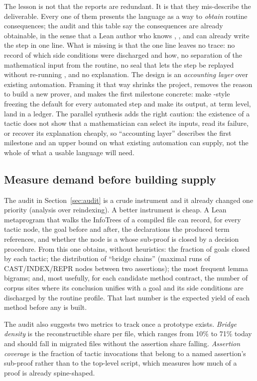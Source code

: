 \documentclass[11pt,a4paper]{article}
\newcommand{\code}[1]{\texttt{\detokenize{#1}}}
\theoremstyle{definition}
\begin{document}
The lesson is not that the reports are redundant. It is that they mis-describe the deliverable. Every one of them presents the language as a way to \emph{obtain} routine consequences; the audit and this table say the consequences are already obtainable, in the sense that a Lean author who knows \code{gcongr}, \code{positivity}, \code{push_cast} and \code{filter_upwards} can already write the step in one line. What is missing is that the one line leaves no trace: no record of which side conditions were discharged and how, no separation of the mathematical input from the routine, no seal that lets the step be replayed without re-running \code{simp}, and no explanation. The design is an \emph{accounting layer} over existing automation. Framing it that way shrinks the project, removes the reason to build a new prover, and makes the first milestone concrete: make \code{says}-style freezing the default for every automated step and make its output, at term level, land in a ledger. The parallel synthesis adds the right caution: the existence of a tactic does not show that a mathematician can select its inputs, read its failure, or recover its explanation cheaply, so ``accounting layer'' describes the first milestone and an upper bound on what existing automation can supply, not the whole of what a usable language will need.

\subsection{Measure demand before building supply}
\label{sec:demand}
The audit in Section~\ref{sec:audit} is a crude instrument and it already changed one priority (analysis over reindexing). A better instrument is cheap. A Lean metaprogram that walks the InfoTrees of a compiled file can record, for every tactic node, the goal before and after, the declarations the produced term references, and whether the node is a \code{have} whose sub-proof is closed by a decision procedure. From this one obtains, without heuristics: the fraction of goals closed by each tactic; the distribution of ``bridge chains'' (maximal runs of CAST/INDEX/REPR nodes between two assertions); the most frequent lemma bigrams; and, most usefully, for each candidate method contract, the number of corpus sites where its conclusion unifies with a goal and its side conditions are discharged by the routine profile. That last number is the expected yield of each method before any is built.

The audit also suggests two metrics to track once a prototype exists. \emph{Bridge density} is the reconstructible share per file, which ranges from 10\% to 71\% today and should fall in migrated files without the assertion share falling. \emph{Assertion coverage} is the fraction of tactic invocations that belong to a named assertion's sub-proof rather than to the top-level script, which measures how much of a proof is already spine-shaped.
\end{document}
